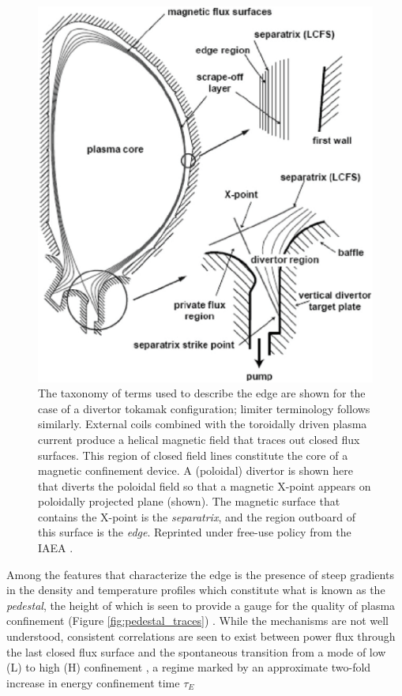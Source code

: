 \documentclass[11pt,titlepage]{report}
\begin{document}
\begin{figure}[h!]
  \centering
    \includegraphics[scale = 0.35]{graphics/edge_anatomy.eps}
  \caption{The taxonomy of terms used to describe the edge are shown for the case of a divertor tokamak configuration; limiter terminology follows similarly. External coils combined with the toroidally driven plasma current produce a helical magnetic field that traces out closed flux surfaces. This region of closed field lines constitute the core of a magnetic confinement device. A (poloidal) divertor is shown here that diverts the poloidal field so that a magnetic X-point appears on poloidally projected plane (shown). The magnetic surface that contains the X-point is the \emph{separatrix}, and the region outboard of this surface is the \emph{edge}. Reprinted under free-use policy from the IAEA \cite{IAEA}.}
  \label{fig:edge_anatomy}
\end{figure}

Among the features that characterize the edge is the presence of steep gradients in the density and temperature profiles which constitute what is known as the \emph{pedestal}, the height of which is seen to provide a gauge for the quality of plasma confinement (Figure \ref{fig:pedestal_traces}) \cite{Zohm}. While the mechanisms are not well understood, consistent correlations are seen to exist between power flux through the last closed flux surface and the spontaneous transition from a mode of low (L) to high (H) confinement \cite[p. 4]{Zohm}, a regime marked by an approximate two-fold increase in energy confinement time $\tau_E$ \cite[p. 358]{Stangeby}
\end{document}
